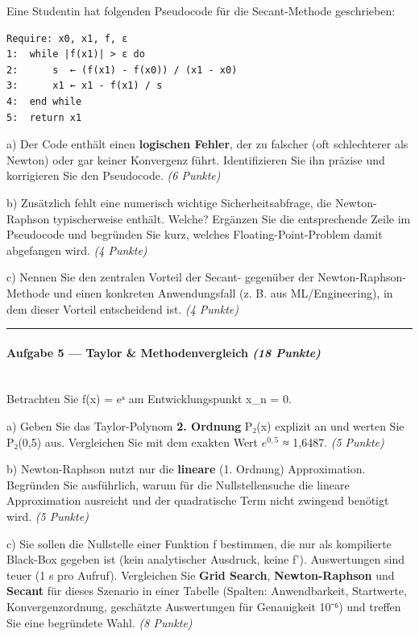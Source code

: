 \documentclass[11pt, a4paper]{article}
\begin{document}
Eine Studentin hat folgenden Pseudocode für die Secant-Methode geschrieben:


\begin{lstlisting}
Require: x0, x1, f, ε
1:  while |f(x1)| > ε do
2:      s  ← (f(x1) - f(x0)) / (x1 - x0)
3:      x1 ← x1 - f(x1) / s
4:  end while
5:  return x1
\end{lstlisting}


a) Der Code enthält einen \textbf{logischen Fehler}, der zu falscher (oft schlechterer als Newton) oder gar keiner Konvergenz führt. Identifizieren Sie ihn präzise und korrigieren Sie den Pseudocode. \textit{(6 Punkte)}


b) Zusätzlich fehlt eine numerisch wichtige Sicherheitsabfrage, die Newton-Raphson typischerweise enthält. Welche? Ergänzen Sie die entsprechende Zeile im Pseudocode und begründen Sie kurz, welches Floating-Point-Problem damit abgefangen wird. \textit{(4 Punkte)}


c) Nennen Sie den zentralen Vorteil der Secant- gegenüber der Newton-Raphson-Methode und einen konkreten Anwendungsfall (z. B. aus ML/Engineering), in dem dieser Vorteil entscheidend ist. \textit{(4 Punkte)}



\noindent\textcolor{rulegray}{\rule{\linewidth}{0.4pt}}


\paragraph{Aufgabe 5 — Taylor \& Methodenvergleich \textit{(18 Punkte)}}\mbox{}\\[2pt]

Betrachten Sie f(x) = eˣ am Entwicklungspunkt x\_n = 0.


a) Geben Sie das Taylor-Polynom \textbf{2. Ordnung} P₂(x) explizit an und werten Sie P₂(0,5) aus. Vergleichen Sie mit dem exakten Wert $e^{0,5}$ ≈ 1,6487. \textit{(5 Punkte)}


b) Newton-Raphson nutzt nur die \textbf{lineare} (1. Ordnung) Approximation. Begründen Sie ausführlich, warum für die Nullstellensuche die lineare Approximation ausreicht und der quadratische Term nicht zwingend benötigt wird. \textit{(5 Punkte)}


c) Sie sollen die Nullstelle einer Funktion f bestimmen, die nur als kompilierte Black-Box gegeben ist (kein analytischer Ausdruck, keine f'). Auswertungen sind teuer (1 s pro Aufruf). Vergleichen Sie \textbf{Grid Search}, \textbf{Newton-Raphson} und \textbf{Secant} für dieses Szenario in einer Tabelle (Spalten: Anwendbarkeit, Startwerte, Konvergenzordnung, geschätzte Auswertungen für Genauigkeit 10⁻⁶) und treffen Sie eine begründete Wahl. \textit{(8 Punkte)}
\end{document}
